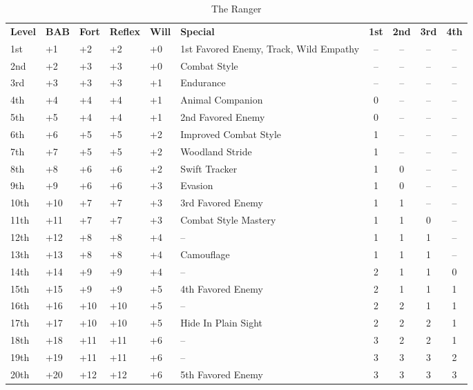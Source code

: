 \begin{table}[htb]
\caption{The Ranger}
\centering
\begin{tabular}{*{6}{l}*{4}{c}}
\textbf{Level} & \textbf{BAB} & \textbf{Fort} & \textbf{Reflex} & \textbf{Will} & \textbf{Special} & \textbf{1st} & \textbf{2nd} & \textbf{3rd} & \textbf{4th} \\
1st & +1 & +2 & +2 & +0 & 1st Favored Enemy, Track, Wild Empathy & -- & -- & -- & -- \\
2nd & +2 & +3 & +3 & +0 & Combat Style & -- & -- & -- & -- \\
3rd & +3 & +3 & +3 & +1 & Endurance & -- & -- & -- & -- \\
4th & +4 & +4 & +4 & +1 & Animal Companion & 0 & -- & -- & -- \\
5th & +5 & +4 & +4 & +1 & 2nd Favored Enemy & 0 & -- & -- & -- \\
6th & +6 & +5 & +5 & +2 & Improved Combat Style & 1 & -- & -- & -- \\
7th & +7 & +5 & +5 & +2 & Woodland Stride & 1 & -- & -- & -- \\
8th & +8 & +6 & +6 & +2 & Swift Tracker & 1 & 0 & -- & -- \\
9th & +9 & +6 & +6 & +3 & Evasion & 1 & 0 & -- & -- \\
10th & +10 & +7 & +7 & +3 & 3rd Favored Enemy & 1 & 1 & -- & -- \\
11th & +11 & +7 & +7 & +3 & Combat Style Mastery & 1 & 1 & 0 & -- \\
12th & +12 & +8 & +8 & +4 & -- & 1 & 1 & 1 & -- \\
13th & +13 & +8 & +8 & +4 & Camouflage & 1 & 1 & 1 & -- \\
14th & +14 & +9 & +9 & +4 & -- & 2 & 1 & 1 & 0 \\
15th & +15 & +9 & +9 & +5 & 4th Favored Enemy & 2 & 1 & 1 & 1 \\
16th & +16 & +10 & +10 & +5 & -- & 2 & 2 & 1 & 1 \\
17th & +17 & +10 & +10 & +5 & Hide In Plain Sight & 2 & 2 & 2 & 1 \\
18th & +18 & +11 & +11 & +6 & -- & 3 & 2 & 2 & 1 \\
19th & +19 & +11 & +11 & +6 & -- & 3 & 3 & 3 & 2 \\
20th & +20 & +12 & +12 & +6 & 5th Favored Enemy & 3 & 3 & 3 & 3 \\
\end{tabular}
\end{table}

\ClassFeatures

